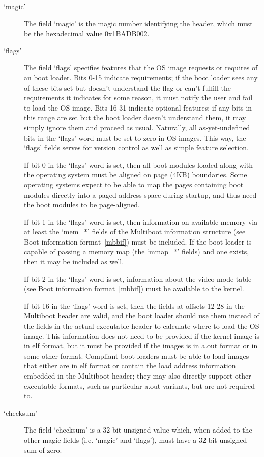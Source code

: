 \begin{description}

\item[‘magic’]
The field ‘magic’ is the magic number identifying the header, which must be the
hexadecimal value 0x1BADB002.

\item[‘flags’]

The field ‘flags’ specifies features that the OS image requests or requires of
an boot loader. Bits 0-15 indicate requirements; if the boot loader sees any of
these bits set but doesn't understand the flag or can't fulfill the requirements
it indicates for some reason, it must notify the user and fail to load the OS
image. Bits 16-31 indicate optional features; if any bits in this range are set
but the boot loader doesn't understand them, it may simply ignore them and
proceed as usual. Naturally, all as-yet-undefined bits in the ‘flags’ word must
be set to zero in OS images. This way, the ‘flags’ fields serves for version
control as well as simple feature selection.

If bit 0 in the ‘flags’ word is set, then all boot modules loaded along with the
operating system must be aligned on page (4KB) boundaries. Some operating
systems expect to be able to map the pages containing boot modules directly into
a paged address space during startup, and thus need the boot modules to be
page-aligned.

If bit 1 in the ‘flags’ word is set, then information on available memory via at
least the ‘mem\_*’ fields of the Multiboot information structure (see Boot
information format\ \ref{mbbif}) must be included. If the boot loader is capable
of passing a memory map (the ‘mmap\_*’ fields) and one exists, then it may be
included as well.

If bit 2 in the ‘flags’ word is set, information about the video mode table (see
Boot information format\ \ref{mbbif}) must be available to the kernel.

If bit 16 in the ‘flags’ word is set, then the fields at offsets 12-28 in the
Multiboot header are valid, and the boot loader should use them instead of the
fields in the actual executable header to calculate where to load the OS image.
This information does not need to be provided if the kernel image is in elf
format, but it must be provided if the images is in a.out format or in some
other format. Compliant boot loaders must be able to load images that either are
in elf format or contain the load address information embedded in the Multiboot
header; they may also directly support other executable formats, such as
particular a.out variants, but are not required to.

\item[‘checksum’]
The field ‘checksum’ is a 32-bit unsigned value which, when added to the other
magic fields (i.e. ‘magic’ and ‘flags’), must have a 32-bit unsigned sum of
zero.

\end{description}

